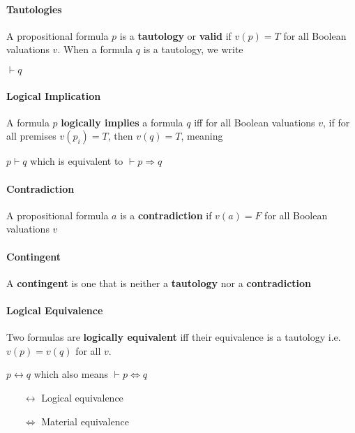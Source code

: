    \paragraph{Tautologies} A propositional formula $p$ is a
    \textbf{tautology} or \textbf{valid} if $v(p) = T$ for all Boolean
    valuations $v$. When a formula $q$ is a tautology, we write
    \begin{center}
       $\vdash q$
    \end{center}

    \paragraph{Logical Implication} A formula $p$ \textbf{logically
    implies} a formula $q$ iff for all Boolean valuations $v$, if for all
    premises $v(p_i) =
    T$, then $v(q) = T$, meaning
    \begin{center}
      $p \vdash q$ which is equivalent to $\vdash p \Rightarrow q$
    \end{center}

    \paragraph{Contradiction} A propositional formula $a$ is a
    \textbf{contradiction} if $v(a) = F$ for all Boolean valuations $v$

    \paragraph{Contingent} A \textbf{contingent} is one that is neither a
    \textbf{tautology} nor a \textbf{contradiction}

    \paragraph{Logical Equivalence} Two formulas are \textbf{logically
    equivalent} iff their equivalence is a tautology i.e. $v(p) = v(q)$ for
    all $v$.
    \begin{center}
      $p\leftrightarrow q$ which also means $\vdash p \Leftrightarrow q$
    \end{center}
    \begin{itemize}
      \item[$\leftrightarrow$] Logical equivalence
      \item[$\Leftrightarrow$] Material equivalence
    \end{itemize}

